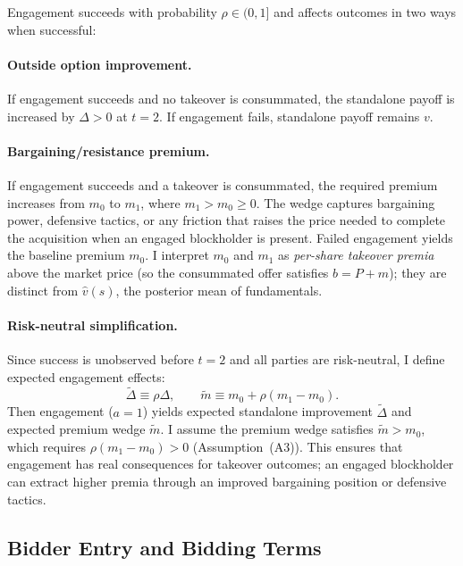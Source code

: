 \documentclass[11pt]{article}
\newcommand{\1}{\mathbf{1}}
\begin{document}
Engagement succeeds with probability $\rho \in (0,1]$ and affects outcomes in two ways when successful:

\paragraph{Outside option improvement.} If engagement succeeds and no takeover is consummated, the standalone payoff is increased by $\Delta > 0$ at $t=2$. If engagement fails, standalone payoff remains $v$.

\paragraph{Bargaining/resistance premium.} If engagement succeeds and a takeover is consummated, the required premium increases from $m_0$ to $m_1$, where $m_1 > m_0 \geq 0$. The wedge captures bargaining power, defensive tactics, or any friction that raises the price needed to complete the acquisition when an engaged blockholder is present. Failed engagement yields the baseline premium $m_0$.
I interpret $m_0$ and $m_1$ as \emph{per-share takeover premia} above the market price (so the consummated offer satisfies $b=P+m$); they are distinct from $\hat{v}(s)$, the posterior mean of fundamentals.

\paragraph{Risk-neutral simplification.} Since success is unobserved before $t=2$ and all parties are risk-neutral, I define expected engagement effects:
\[
\tilde{\Delta} \equiv \rho \Delta, \qquad \tilde{m} \equiv m_0 + \rho(m_1 - m_0).
\]
Then engagement ($a=1$) yields expected standalone improvement $\tilde{\Delta}$ and expected premium wedge $\tilde{m}$. I assume the premium wedge satisfies $\tilde{m} > m_0$, which requires $\rho(m_1 - m_0) > 0$ (Assumption~\textup{(A3)}). This ensures that engagement has real consequences for takeover outcomes; an engaged blockholder can extract higher premia through an improved bargaining position or defensive tactics.

%
\subsection{Bidder Entry and Bidding Terms}
%
\end{document}
